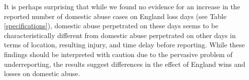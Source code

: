 \documentclass[12pt, a4paper]{article}
\begin{document}









It is perhaps surprising that while we found no evidence for an increase in the reported number of domestic abuse cases on England loss days (see Table \ref{specifications}), domestic abuse perpetrated on these days seems to be characteristically different from domestic abuse perpetrated on other days in terms of location, resulting injury, and time delay before reporting. While these findings should be interpreted with caution due to the pervasive problem of underreporting, the results suggest differences in the effect of England wins and losses on domestic abuse.


\end{document}
